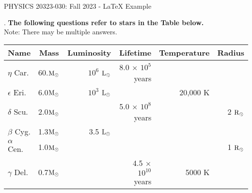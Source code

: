 \documentclass[12pt]{article}
\begin{document}
\def\pos{\medskip\quad}
\def\subpos{\smallskip \qquad}


\begin{center}
{\large
PHYSICS 20323-030: Fall 2023 - LaTeX Example
}\\
\end{center}


\vskip0.05in
. {\bf The following questions refer to stars in the Table below.} \\
Note: There may be multiple answers.


\vskip0.15in
\begin{tabular}{|l|c|r|r|r|r|}\hline
Name & Mass & Luminosity & Lifetime & Temperature & Radius \\\hline

$\eta$ Car. & 60.\(\textup{M}_\odot\) & $10^6$ \(\textup{L}_\odot\) & 8.0 $\times$ $10^5$ years &  & \\\hline

$\epsilon$ Eri. & 6.0\(\textup{M}_\odot\) & $10^3$ \(\textup{L}_\odot\) &  & 20,000 K & \\\hline

$\delta$ Scu. & 2.0\(\textup{M}_\odot\) & & 5.0 $\times$ $10^8$ years & & 2 \(\textup{R}_\odot\) \\\hline

$\beta$ Cyg. & 1.3\(\textup{M}_\odot\) & 3.5 \(\textup{L}_\odot\) & & & \\\hline

$\alpha$ Cen. & 1.0\(\textup{M}_\odot\) & & & & 1 \(\textup{R}_\odot\) \\\hline

$\gamma$ Del. & 0.7\(\textup{M}_\odot\) & & 4.5 $\times$ $10^{10}$ years & 5000 K & \\\hline
\end{tabular}
\end{document}

